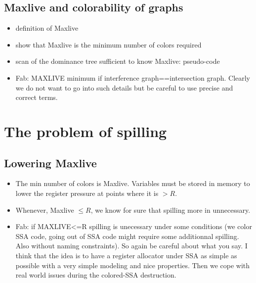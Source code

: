 {\subsection{Maxlive and colorability of graphs}
\begin{itemize}
  \item definition of Maxlive
  \item show that Maxlive is the minimum number of colors required
  \item scan of the dominance tree sufficient to know Maxlive: pseudo-code
  \item Fab: MAXLIVE minimum if interference graph==intersection graph. Clearly we do not want to go into such details but be careful to use precise and correct terms.

\end{itemize}
    


\section{The problem of spilling}

\subsection{Lowering Maxlive}
\begin{itemize}
  \item The min number of colors is Maxlive. Variables must be stored in memory 
    to lower the register pressure at points where it is $>R$.
  \item Whenever, Maxlive $\leq R$, we know for sure that spilling more in 
    unnecessary.
  \item Fab: if MAXLIVE<=R spilling is unecessary under some conditions (we color SSA code, going out of SSA code might require some additionnal spilling. Also without naming constraints). So again be careful about what you say. I think that the idea is to have a register allocator under SSA as simple as possible with a very simple modeling and nice properties. Then we cope with real world issues during the colored-SSA destruction.


\end{itemize}

}

